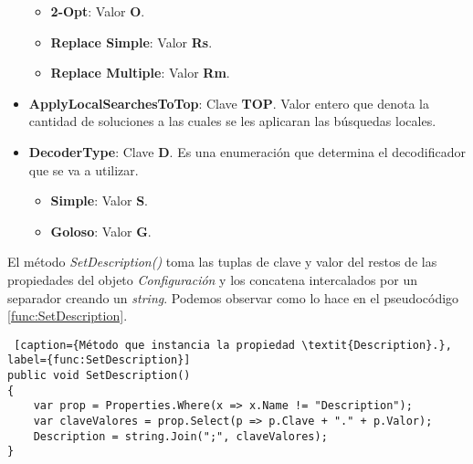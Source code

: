 \begin{itemize}
\begin{itemize}
		\item \textbf{2-Opt}: Valor \textbf{O}.
		\item \textbf{Replace Simple}: Valor \textbf{Rs}.
		\item \textbf{Replace Multiple}: Valor \textbf{Rm}.
	\end{itemize}  
  \item \textbf{ApplyLocalSearchesToTop}: Clave \textbf{TOP}. Valor entero que denota la cantidad de soluciones a las cuales se les aplicaran las búsquedas locales.
  \item \textbf{DecoderType}: Clave \textbf{D}. Es una enumeración que determina el decodificador que se va a utilizar.
	\begin{itemize}
		\item \textbf{Simple}: Valor \textbf{S}.
		\item \textbf{Goloso}: Valor \textbf{G}.
	\end{itemize}  
\end{itemize}

\bigskip

El método \textit{SetDescription()} toma las tuplas de clave y valor del restos de las propiedades del objeto \textit{Configuración} y los concatena intercalados por un separador creando un \textit{string}. Podemos observar como lo hace en el pseudocódigo \ref{func:SetDescription}.

\bigskip

\begin{minipage}{\linewidth}
\begin{lstlisting} [caption={Método que instancia la propiedad \textit{Description}.}, label={func:SetDescription}]
public void SetDescription()
{ 
	var prop = Properties.Where(x => x.Name != "Description");
	var claveValores = prop.Select(p => p.Clave + "." + p.Valor);
	Description = string.Join(";", claveValores);
}
\end{lstlisting}
\end{minipage}

\bigskip

